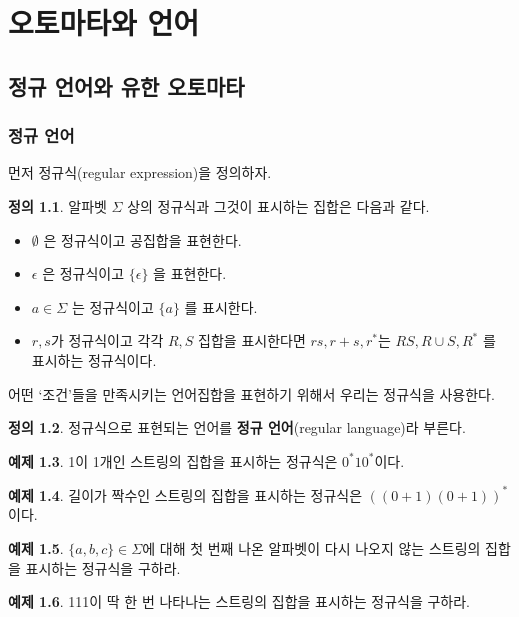 \documentclass[b5paper, 10pt]{book}
\theoremstyle{definition}
\newtheorem{defn}{정의}[chapter]
\newtheorem{ex}[defn]{예제}
\begin{document}
\part{오토마타와 언어}
\chapter{정규 언어와 유한 오토마타} 
\section{정규 언어}
먼저 정규식(regular expression)을 정의하자.
\begin{defn}
    알파벳 $\Sigma$ 상의 정규식과 그것이 표시하는 집합은 다음과 같다.
\begin{itemize}
    \item $\emptyset$ 은 정규식이고 공집합을 표현한다.
    \item $\epsilon$ 은 정규식이고 $\{\epsilon\}$ 을 표현한다.
    \item $a \in \Sigma$ 는 정규식이고 $\{a\}$ 를 표시한다.
    \item $r, s$가 정규식이고 각각 $R, S$ 집합을 표시한다면 
    $rs, r+s, r^*$는 $RS, R\cup S, R^* $ 를 표시하는 정규식이다. 
\end{itemize}
\end{defn}
어떤 `조건'들을 만족시키는 언어집합을 표현하기 위해서 우리는 정규식을 사용한다.
\begin{defn}
정규식으로 표현되는 언어를 \textbf{정규 언어}(regular language)라
부른다.
\end{defn}
\begin{ex}
    1이 1개인 스트링의 집합을 표시하는 정규식은 $0^* 1 0^*$이다.
\end{ex}
\begin{ex}
  길이가 짝수인 스트링의 집합을 표시하는 정규식은 $((0+1)(0+1))^*$이다.  
\end{ex} 
\begin{ex}
$\{a, b, c\} \in \Sigma$에 대해 첫 번째 나온 알파벳이 다시 나오지 않는 
스트링의 집합을 표시하는 정규식을 구하라.
\end{ex}
\begin{ex}
111이 딱 한 번 나타나는 스트링의 집합을 표시하는 정규식을 구하라.
\end{ex}
\end{document}
